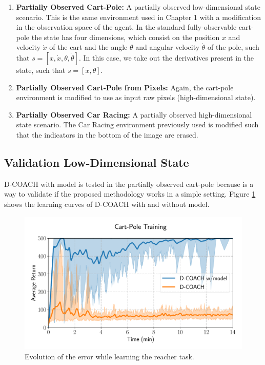 \begin{enumerate}
    \item \textbf{Partially Observed Cart-Pole:} A partially observed low-dimensional state scenario. This is the same environment used in Chapter 1 with a modification in the observation space of the agent. In the standard fully-observable cart-pole the state has four dimensions, which consist on the position $x$ and velocity $\dot x$ of the cart and the angle $\theta$ and angular velocity $\dot \theta$ of the pole, such that $s=[x, \dot x, \theta, \dot \theta]$. In this case, we take out the derivatives present in the state, such that $s=[x, \theta]$.
    \item \textbf{Partially Observed Cart-Pole from Pixels:} Again, the cart-pole environment is modified to use as input raw pixels (high-dimensional state). 
    \item \textbf{Partially Observed Car Racing:} A partially observed high-dimensional state scenario. The Car Racing environment previously used is modified such that the indicators in the bottom of the image are erased. 
    
\end{enumerate}

\subsection{Validation Low-Dimensional State}

D-COACH with model is tested in the partially observed cart-pole because is a way to validate if the proposed methodology works in a simple setting. Figure \ref{fig:ld_cartpole_model} shows the learning curves of D-COACH with and without model. 

\begin{figure}[h]
    \centering
    \includegraphics[width=0.9\linewidth]{imagenes/cap3/cartpole_LD_model.pdf}
    \caption{Evolution of the error while learning the reacher task. }
    \label{fig:ld_cartpole_model}
\end{figure}

